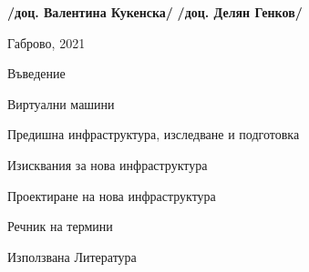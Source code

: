 \documentclass[11pt,a4paper,twoside]{article}
\begin{document}
\begin{center}
{			\begin{flushright}
				\Large{\textbf{/доц. Валентина Кукенска/}}\hspace{4cm} \Large{\textbf{/доц. Делян Генков/}}     
			\end{flushright}
			\vspace*{1.7cm}
			\Large{Габрово, 2021}    
		}
	\end{center}
	\newpage
	
	\tableofcontents
	\thispagestyle{contents}
	\newpage
	
	{Въведение}\label{Abstr}
	\newpage
	
	{Виртуални машини}\label{Sect1}
	\newpage
	
	{Предишна инфраструктура, изследване и подготовка}\label{Sect2}
	\newpage
	
	{Изисквания за нова инфраструктура}\label{Sect3}
	\newpage
	
	{Проектиране на нова инфраструктура}\label{Sect4}
	\newpage
	
	{Речник на термини}\label{Sect5}
	\newpage
	


{Използвана Литература}\label{Sect7}
%
\newpage

	\label{Ackn}

\newpage
%

%


%
\end{document}

